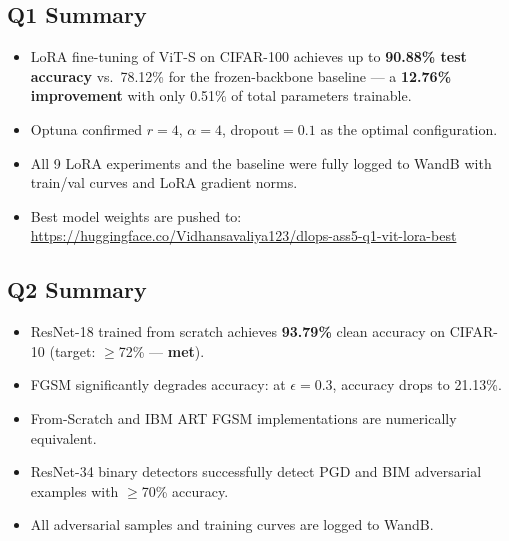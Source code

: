 \documentclass[11pt,a4paper]{article}
\begin{document}
\subsection*{Q1 Summary}
\begin{itemize}
  \item LoRA fine-tuning of ViT-S on CIFAR-100 achieves up to \textbf{90.88\% test accuracy} vs.\ 78.12\% for the frozen-backbone baseline — a \textbf{12.76\% improvement} with only 0.51\% of total parameters trainable.
  \item Optuna confirmed $r=4$, $\alpha=4$, dropout$=0.1$ as the optimal configuration.
  \item All 9 LoRA experiments and the baseline were fully logged to WandB with train/val curves and LoRA gradient norms.
  \item Best model weights are pushed to: \url{https://huggingface.co/Vidhansavaliya123/dlops-ass5-q1-vit-lora-best}
\end{itemize}

\subsection*{Q2 Summary}
\begin{itemize}
  \item ResNet-18 trained from scratch achieves \textbf{93.79\%} clean accuracy on CIFAR-10 (target: $\geq$72\% — \textbf{met}).
  \item FGSM significantly degrades accuracy: at $\epsilon=0.3$, accuracy drops to 21.13\%.
  \item From-Scratch and IBM ART FGSM implementations are numerically equivalent.
  \item ResNet-34 binary detectors successfully detect PGD and BIM adversarial examples with $\geq$70\% accuracy.
  \item All adversarial samples and training curves are logged to WandB.
\end{itemize}
\end{document}

